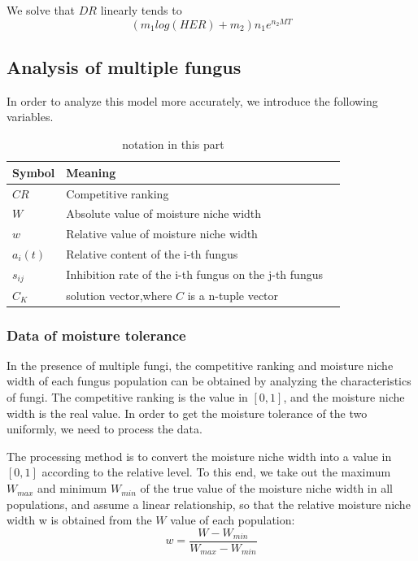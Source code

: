 \documentclass{mcmthesis}
\begin{document}
We solve that $DR$ linearly tends to
\begin{equation} 
	(m_{1}log(HER)+m_{2})n_{1}e^{n_{2}MT}
\end{equation}
\subsection{Analysis of multiple fungus}
In order to analyze this model more accurately, we introduce the following variables.
\begin{table}[h]
	\centering
	\caption{notation in this part}
	\begin{tabular}{p{}p{}m{}}
		\hline
		Symbol& Meaning \\
		\hline
		$CR$     & Competitive ranking\\
		$W$      & Absolute value of moisture niche width\\
		$w$      & Relative value of moisture niche width\\
		$a_{i}(t)$  & Relative content of the i-th fungus\\
		$s_{ij}$ & Inhibition rate of the i-th fungus on the j-th fungus\\
		$C_{K}$  & solution vector,where $C$ is a n-tuple vector\\
		\hline
	\end{tabular}
\end{table}

\subsubsection{Data of moisture tolerance}
In the presence of multiple fungi, the competitive ranking and moisture niche width of each fungus population can be obtained by analyzing the characteristics of fungi. The competitive ranking is the value in $[0,1]$, and the moisture niche width is the real value. In order to get the moisture tolerance of the two uniformly, we need to process the data.

The processing method is to convert the moisture niche width into a value in $[0,1]$ according to the relative level. To this end, we take out the maximum $W_{max}$ and minimum $W_{min}$ of the true value of the moisture niche width in all populations, and assume a linear relationship, so that the relative moisture niche width w is obtained from the $W$ value of each population: 
\begin{equation} 
	w=\frac{W-W_{min}}{W_{max}-W_{min}}
\end{equation}
\end{document}

